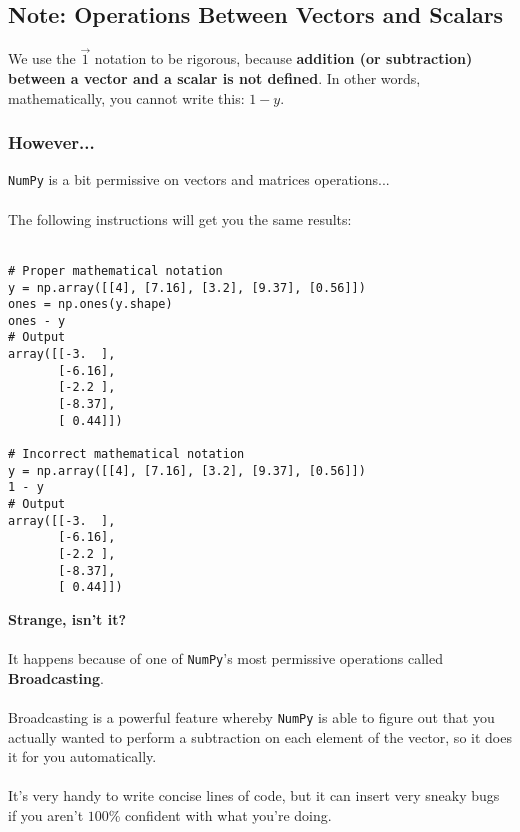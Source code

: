 \subsection*{Note: Operations Between Vectors and Scalars}
We use the $\vec{1}$ notation to be rigorous, because \textbf{addition (or subtraction) between a vector and a scalar is not defined}.
In other words, mathematically, you cannot write this: $1 - y$.\\

\subsubsection*{However...}
\texttt{NumPy} is a bit permissive on vectors and matrices operations...\\
\\
The following instructions will get you the same results:\\
\\
\begin{verbatim}
# Proper mathematical notation
y = np.array([[4], [7.16], [3.2], [9.37], [0.56]])
ones = np.ones(y.shape)
ones - y
# Output
array([[-3.  ],
       [-6.16],
       [-2.2 ],
       [-8.37],
       [ 0.44]])

# Incorrect mathematical notation
y = np.array([[4], [7.16], [3.2], [9.37], [0.56]])
1 - y
# Output
array([[-3.  ],
       [-6.16],
       [-2.2 ],
       [-8.37],
       [ 0.44]])
\end{verbatim}
\newline
\textbf{Strange, isn't it?}\\
\\
It happens because of one of \texttt{NumPy}'s 
most permissive operations called \textbf{Broadcasting}.\\
\\
Broadcasting is a powerful feature whereby \texttt{NumPy} is able to figure out 
that you actually wanted to perform a subtraction on each element of the vector, 
so it does it for you automatically.\\
\\
It's very handy to write concise lines of code, but it can insert 
very sneaky bugs if you aren't $100$\% confident with what you're doing.\\
